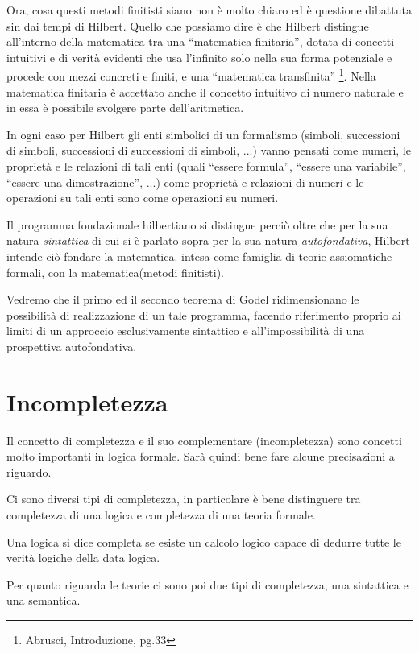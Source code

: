 Ora, cosa questi metodi finitisti siano non è molto chiaro ed è questione
dibattuta sin dai tempi di Hilbert. Quello che possiamo dire è che
Hilbert distingue all'interno della matematica tra una {}``matematica
finitaria'', dotata di concetti intuitivi e di verità evidenti che
usa l'infinito solo nella sua forma potenziale e procede con mezzi
concreti e finiti, e una {}``matematica transfinita''%
\footnote{Abrusci, Introduzione, pg.33%
}. Nella matematica finitaria è accettato anche il concetto intuitivo
di numero naturale e in essa è possibile svolgere parte dell'aritmetica.

In ogni caso per Hilbert gli enti simbolici di un formalismo (simboli,
successioni di simboli, successioni di successioni di simboli, ...)
vanno pensati come numeri, le proprietà e le relazioni di tali enti
(quali {}``essere formula'', {}``essere una variabile'', {}``essere
una dimostrazione'', ...) come proprietà e relazioni di numeri e
le operazioni su tali enti sono come operazioni su numeri.

Il programma fondazionale hilbertiano si distingue perciò oltre che
per la sua natura \emph{sintattica} di cui si è parlato sopra per
la sua natura \emph{autofondativa}, Hilbert intende ciò fondare la
matematica. intesa come famiglia di teorie assiomatiche formali, con
la matematica(metodi finitisti). 

Vedremo che il primo ed il secondo teorema di Godel ridimensionano
le possibilità di realizzazione di un tale programma, facendo riferimento
proprio ai limiti di un approccio esclusivamente sintattico e all'impossibilità
di una prospettiva autofondativa.


\section{Incompletezza}

Il concetto di completezza e il suo complementare (incompletezza)
sono concetti molto importanti in logica formale. Sarà quindi bene
fare alcune precisazioni a riguardo.

Ci sono diversi tipi di completezza, in particolare è bene distinguere
tra completezza di una logica e completezza di una teoria formale.

\emph{}Una logica si dice completa se esiste
un calcolo logico capace di dedurre tutte le verità logiche della
data logica.

Per quanto riguarda le teorie ci sono poi due tipi di completezza,
una sintattica e una semantica.

